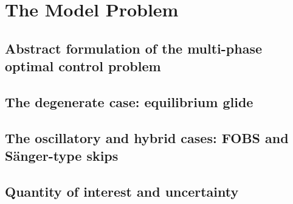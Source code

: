 
\section{The Model Problem}
\label{sec:model}

\subsection{Abstract formulation of the multi-phase optimal control problem}
\label{sub:abstract_formulation}

\subsection{The degenerate case: equilibrium glide}
\label{sub:degenerate_case}

\subsection{The oscillatory and hybrid cases: FOBS and Sänger-type skips}
\label{sub:oscillatory_and_hybrid_cases}

\subsection{Quantity of interest and uncertainty}
\label{sub:quantity_of_interest_and_uncertainty}

